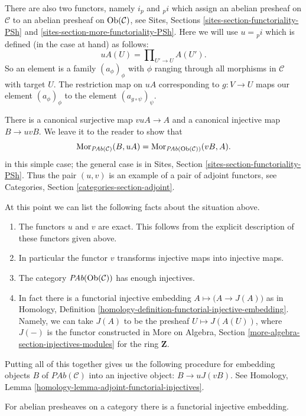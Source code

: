 \medskip\noindent
There are also two functors, namely $i_p$ and ${}_pi$
which assign an abelian presheaf on $\mathcal{C}$
to an abelian presheaf on $\mathop{\mathrm{Ob}}\nolimits(\mathcal{C})$, see
Sites, Sections \ref{sites-section-functoriality-PSh} and
\ref{sites-section-more-functoriality-PSh}.
Here we will use $u = {}_pi$ which is defined (in the case at hand)
as follows:
$$
uA(U) = \prod\nolimits_{U' \to U} A(U').
$$
So an element is a family $(a_\phi)_\phi$ with $\phi$
ranging through all morphisms in $\mathcal{C}$ with target $U$.
The restriction map on $uA$ corresponding to $g : V \to U$
maps our element $(a_\phi)_\phi$ to the element
$(a_{g \circ \psi})_\psi$.

\medskip\noindent
There is a canonical surjective map $vuA \to A$ and a canonical
injective map $B \to uvB$. We leave it to the reader to show that
$$
\mathop{\mathrm{Mor}}\nolimits_{\textit{PAb}(\mathcal{C})}(B, uA)
=
\mathop{\mathrm{Mor}}\nolimits_{\textit{PAb}(\mathop{\mathrm{Ob}}\nolimits(\mathcal{C}))}(vB, A).
$$
in this simple case; the general case is in
Sites, Section \ref{sites-section-functoriality-PSh}.
Thus the pair $(u, v)$ is an example of a pair of adjoint
functors, see
Categories, Section \ref{categories-section-adjoint}.

\medskip\noindent
At this point we can list the following facts
about the situation above.
\begin{enumerate}
\item The functors $u$ and $v$ are exact. This follows from
the explicit description of these functors given above.
\item In particular the functor $v$ transforms injective maps
into injective maps.
\item The category $\textit{PAb}(\mathop{\mathrm{Ob}}\nolimits(\mathcal{C}))$
has enough injectives.
\item In fact there is a functorial injective embedding
$A \mapsto \big(A \to J(A)\big)$ as in
Homology, Definition \ref{homology-definition-functorial-injective-embedding}.
Namely, we can take $J(A)$ to be the
presheaf $U\mapsto J(A(U))$, where
$J(-)$ is the functor constructed in
More on Algebra, Section \ref{more-algebra-section-injectives-modules}
for the ring $\mathbf{Z}$.
\end{enumerate}
Putting all of this together gives us the following procedure
for embedding objects $B$ of $\textit{PAb}(\mathcal{C})$ into
an injective object: $B \to uJ(vB)$. See
Homology, Lemma \ref{homology-lemma-adjoint-functorial-injectives}.

\begin{proposition}
\label{proposition-presheaves-injectives}
For abelian presheaves on a category there is a functorial injective
embedding.
\end{proposition}

